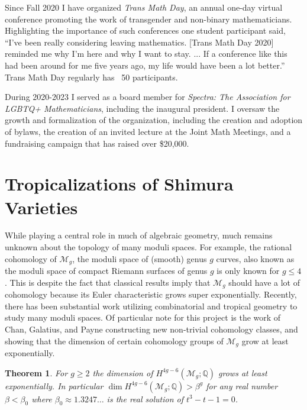 \documentclass[11pt,reqno]{amsart}
\newtheorem{theorem}[lemma]{Theorem}
\theoremstyle{remark}
\newcommand{\QQ}{\mathbb{Q}}
\newcommand{\cM}{\mathcal{M}}
\begin{document}
Since Fall 2020 I have organized \textit{Trans Math Day}, an annual one-day virtual conference promoting the work of transgender and non-binary mathematicians. Highlighting the importance of such conferences one student participant said, ``I've been really considering leaving mathematics.  [Trans Math Day 2020] reminded me why I'm here and why I want to stay. ... If a conference like this had been around for me five years ago, my life would have been a lot better.'' Trans Math Day regularly has ~50 participants. 

During 2020-2023 I served as a board member for \textit{Spectra: The Association for LGBTQ+ Mathematicians}, including the inaugural president. I oversaw the growth and formalization of the organization, including the creation and adoption of bylaws, the creation of an invited lecture at the Joint Math Meetings, and a fundraising campaign that has raised over \$20,000.



\section{Tropicalizations of Shimura Varieties}\label{sec:trop-moduli}

While playing a central role in much of algebraic geometry, much remains unknown about the topology of many moduli spaces. For example, the rational cohomology of $\cM_{g}$, the moduli space of (smooth) genus $g$ curves, also known as the moduli space of compact Riemann surfaces of genus $g$ is only known for $g\leq 4$. This is despite the fact that classical results imply that $\cM_{g}$ should have a lot of cohomology because its Euler characteristic grows super exponentially. Recently, there has been substantial work utilizing combinatorial and tropical geometry to study many moduli spaces. Of particular note for this project is the work of Chan, Galatius, and Payne constructing new non-trivial cohomology classes, and showing that the dimension of certain cohomology groups of $\cM_{g}$ grow at least exponentially. 

\begin{theorem}\cite[Theorem 1.1]{CGP21}\label{thm:Mg}
For $g\geq2$ the dimension of $H^{4g-6}(\cM_{g};\QQ)$ grows at least exponentially. In particular $\dim H^{4g-6}\left(\cM_{g}; \QQ\right) > \beta^{g}$ for any real number $\beta<\beta_{0}$ where $\beta_{0}\approx1.3247\ldots$ is the real solution of $t^3-t-1=0$. 
\end{theorem}
\end{document}
